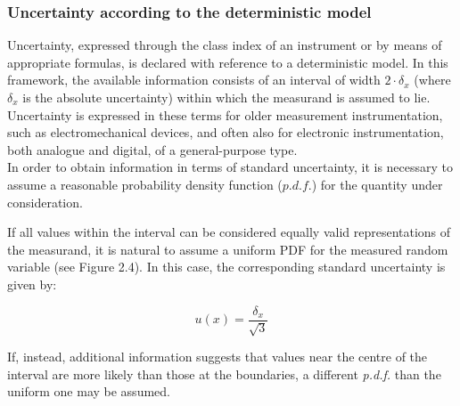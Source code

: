 \documentclass[../main.tex]{subfiles}
\begin{document}
\subsubsection*{Uncertainty according to the deterministic model}

Uncertainty, expressed through the class index of an instrument or by means of appropriate formulas, is declared with reference to a deterministic model. 
In this framework, the available information consists of an interval of width $2 \cdot \delta_x$ (where $\delta_x$ is the absolute uncertainty) within which the measurand is assumed to lie.\\

Uncertainty is expressed in these terms for older measurement instrumentation, such as electromechanical devices, and often also for electronic instrumentation, both analogue and digital, of a general-purpose type.\\

In order to obtain information in terms of standard uncertainty, it is necessary to assume a reasonable probability density function ($p.d.f.$) for the quantity under consideration.

If all values within the interval can be considered equally valid representations of the measurand, it is natural to assume a uniform PDF for the measured random variable (see Figure 2.4). In this case, the corresponding standard uncertainty is given by:

\begin{equation}
	u(x) = \frac{\delta_x}{\sqrt{3}}
\label{eq:243}	
\end{equation}

If, instead, additional information suggests that values near the centre of the interval are more likely than those at the boundaries, a different \textit{p.d.f.} than the uniform one may be assumed. 
\end{document}
